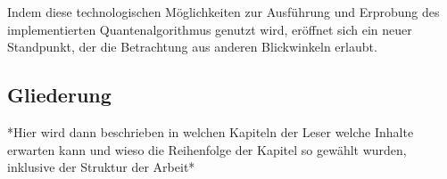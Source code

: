 Indem diese technologischen Möglichkeiten zur Ausführung und Erprobung des implementierten Quantenalgorithmus genutzt wird, 
eröffnet sich ein neuer Standpunkt, der die Betrachtung aus anderen Blickwinkeln erlaubt.


\subsection{Gliederung}
*Hier wird dann beschrieben in welchen Kapiteln der Leser welche Inhalte erwarten kann und wieso die Reihenfolge der Kapitel so gewählt wurden, inklusive der Struktur der Arbeit*


